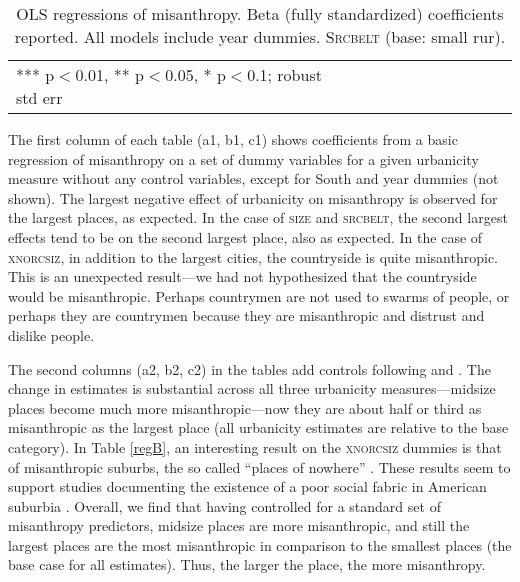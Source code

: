 \documentclass[11pt, letterpaper]{article}
\begin{document}
\begin{spacing}{1.4}
\begin{table}[h!]\centering
\caption{OLS regressions  of misanthropy. Beta (fully standardized) coefficients
  reported. All models include year dummies. \textsc{Srcbelt} (base: small rur).} \label{regC}
\begin{scriptsize} \begin{tabular}{p{1.8in}p{.45in}p{.45in}p{.45in}p{.45in}p{.45in}p{.45in}p{.45in}p{.45in}p{.45in}p{.45 in}}\hline

\hline  *** p$<$0.01, ** p$<$0.05, * p$<$0.1; robust std err
\end{tabular}\end{scriptsize}\end{table}

The first column of each table (a1, b1, c1) shows coefficients from a basic
regression of misanthropy on a set of dummy variables for a given urbanicity
measure without any control variables, except for South and year dummies (not shown). 
The largest negative effect of urbanicity on misanthropy is observed for the largest
places, as expected. In the case of \textsc{size} and \textsc{srcbelt}, the second largest effects tend to be on the second largest place, also as expected.  In
the case of \textsc{xnorcsiz}, in addition to the largest cities, the countryside is quite
misanthropic. This is an unexpected result---we had not hypothesized that the countryside would be misanthropic. Perhaps countrymen are not used to swarms of people, or
perhaps they are countrymen because they are misanthropic and distrust and
dislike people. %

The second columns (a2, b2, c2) in the tables add controls following
\citet{welch07} and \citet{smith97}.
 The change in  estimates is substantial across all three urbanicity
 measures---midsize places become much more misanthropic---now they are about
 half or third as misanthropic as the largest place (all urbanicity estimates
 are relative to the base category). 
 In Table \ref{regB}, an interesting result on the
\textsc{xnorcsiz} dummies is that of misanthropic suburbs, the so called ``places of
nowhere'' \citep{kunstler12}. These results seem to support studies documenting the existence of a poor social fabric in American suburbia \citep{duany01,kunstler12,kay97}.
Overall,
 we find that having controlled for a standard set of misanthropy predictors, midsize places are more misanthropic, and still the
 largest places are the most misanthropic in comparison to the smallest
 places (the base case for all estimates).
Thus, the larger the place, the more misanthropy. 


\end{spacing}
\end{document}
